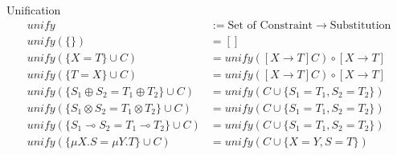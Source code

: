 \documentclass[8pt]{jsarticle}
\begin{document}
\begin{itembox}[c]{Unification}
  \begin{align*}
      unify    &:= \text{Set of Constraint} \rightarrow \text{Substitution} \\
      unify(\{\})             &= [] \\
      unify(\{X = T\} \cup C) &= unify([X \rightarrow T]C) \circ [X \rightarrow T] \\
      unify(\{T = X\} \cup C) &= unify([X \rightarrow T]C) \circ [X \rightarrow T] \\
      unify(\{S_1 \oplus S_2 = T_1 \oplus T_2\} \cup C) &= unify(C \cup \{S_1 = T_1, S_2 = T_2\}) \\
      unify(\{S_1 \otimes S_2 = T_1 \otimes T_2\} \cup C) &= unify(C \cup \{S_1 = T_1, S_2 = T_2\}) \\
      unify(\{S_1 \multimap S_2 = T_1 \multimap T_2\} \cup C) &= unify(C \cup \{S_1 = T_1, S_2 = T_2\}) \\
      unify(\{\mu{X}.S = \mu{Y}.T\} \cup C) &= unify(C \cup \{X = Y, S = T\}) 
  \end{align*}
\end{itembox}

\newpage
\end{document}
